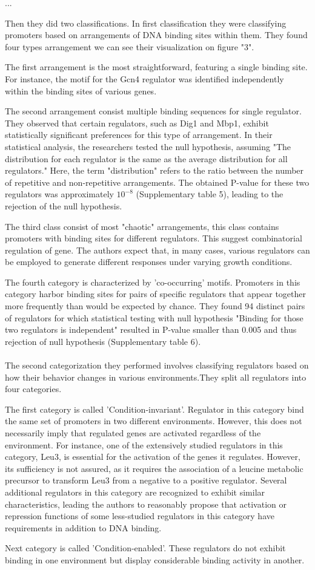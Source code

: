 \documentclass[a4paper]{article}
\begin{document}
 
	
	\pagestyle{plain}
	...
	
	Then they did two classifications. In first classification they were classifying promoters based on arrangements of DNA binding sites within them. They found four types arrangement we can see their visualization on figure "3". 
	
	The first arrangement is the most straightforward, featuring a single binding site. For instance, the motif for the Gcn4 regulator was identified independently within the binding sites of various genes. 
	
	The second arrangement consist multiple binding sequences for single regulator. They observed that certain regulators, such as Dig1 and Mbp1, exhibit statistically significant preferences for this type of arrangement. In their statistical analysis, the researchers tested the null hypothesis, assuming "The distribution for each regulator is the same as the average distribution for all regulators." Here, the term "distribution" refers to the ratio between the number of repetitive and non-repetitive arrangements. The obtained P-value for these two regulators was approximately $10^{-8}$ (Supplementary table 5), leading to the rejection of the null hypothesis. 
	
	The third class consist of most "chaotic" arrangements, this class contains promoters with binding sites for different regulators. This suggest combinatorial regulation of gene. The authors expect that, in many cases, various regulators can be employed to generate different responses under varying growth conditions.
	
	The fourth category is characterized by 'co-occurring' motifs. Promoters in this category harbor binding sites for pairs of specific regulators that appear together more frequently than would be expected by chance. They found 94 distinct pairs of regulators for which statistical testing with null hypothesis "Binding for those two regulators is independent" resulted in P-value smaller than 0.005 and thus rejection of null hypothesis (Supplementary table 6). 
	\\
	\\
	The second categorization they performed involves classifying regulators based on how their behavior changes in various environments.They split all regulators into four categories. 
	
	The first category is called 'Condition-invariant'. Regulator in this category bind the same set of promoters in two different environments. However, this does not necessarily imply that regulated genes are activated regardless of the environment. For instance, one of the extensively studied regulators in this category, Leu3, is essential for the activation of the genes it regulates. However, its sufficiency is not assured, as it requires the association of a leucine metabolic precursor to transform Leu3 from a negative to a positive regulator. Several additional regulators in this category are recognized to exhibit similar characteristics, leading the authors to reasonably propose that activation or repression functions of some less-studied regulators in this category have requirements in addition to DNA binding. 
	
	Next category is called 'Condition-enabled'. These regulators do not exhibit binding in one environment but display considerable binding activity in another. 
	
\end{document}
